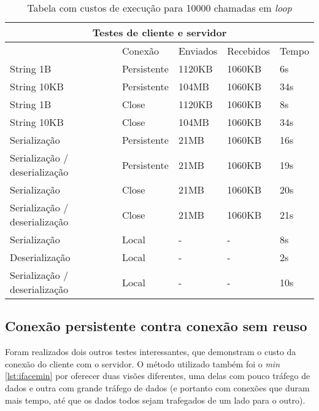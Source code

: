 \documentclass[11pt]{article}
\begin{document}
\renewcommand{\arraystretch}{2}
\begin{table}
\begin{center}
{\footnotesize \begin{tabular}{p{2.5cm} p{2.5cm} p{2.5cm} p{2.5cm} p{2.5cm}}
\hline
\multicolumn{5}{c}{Testes de cliente e servidor} \\ \hline
~ & Conexão & Enviados & Recebidos & Tempo \\ \hline
String 1B & Persistente & 1120KB & 1060KB & 6s \\
String 10KB & Persistente & 104MB & 1060KB & 34s \\
String 1B & Close & 1120KB & 1060KB & 8s \\
String 10KB & Close & 104MB & 1060KB & 34s \\
Serialização & Persistente & 21MB & 1060KB & 16s \\
Serialização / deserialização & Persistente & 21MB & 1060KB & 19s \\
Serialização & Close & 21MB & 1060KB & 20s \\
Serialização / deserialização & Close & 21MB & 1060KB & 21s \\
Serialização & Local & - & - & 8s \\
Deserialização & Local & - & - & 2s \\
Serialização / deserialização & Local & - & - & 10s \\
\hline
\end{tabular}}
\caption{Tabela com custos de execução para 10000 chamadas em \textit{loop}}
\label{tab:perfsize}
\end{center}
\end{table}

\subsection{Conexão persistente contra conexão sem reuso}\label{subsec:persist}

Foram realizados dois outros testes interessantes, que demonstram o custo da
conexão do cliente com o servidor. O método utilizado também foi o
\textit{min} \ref{lst:ifacemin} por oferecer duas visões diferentes, uma delas com
pouco tráfego de dados e outra com grande tráfego de dados (e portanto com
conexões que duram mais tempo, até que os dados todos sejam trafegados de um
lado para o outro).
\end{document}
